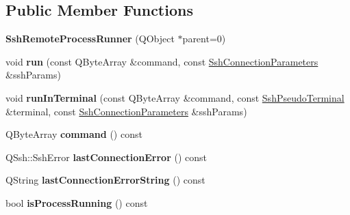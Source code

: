 \subsection*{Public Member Functions}
\begin{DoxyCompactItemize}
\item 
\mbox{\label{class_q_ssh_1_1_ssh_remote_process_runner_ab0f5cac4c6ac449102682a8c6d2ccff6}} 
{\bfseries Ssh\+Remote\+Process\+Runner} (Q\+Object $\ast$parent=0)
\item 
\mbox{\label{class_q_ssh_1_1_ssh_remote_process_runner_af01e487a7ab425c380976ed5f9e18e07}} 
void {\bfseries run} (const Q\+Byte\+Array \&command, const \mbox{\hyperlink{class_q_ssh_1_1_ssh_connection_parameters}{Ssh\+Connection\+Parameters}} \&ssh\+Params)
\item 
\mbox{\label{class_q_ssh_1_1_ssh_remote_process_runner_afe608d1bd15b61b8ef70d24dd8b9edbe}} 
void {\bfseries run\+In\+Terminal} (const Q\+Byte\+Array \&command, const \mbox{\hyperlink{class_q_ssh_1_1_ssh_pseudo_terminal}{Ssh\+Pseudo\+Terminal}} \&terminal, const \mbox{\hyperlink{class_q_ssh_1_1_ssh_connection_parameters}{Ssh\+Connection\+Parameters}} \&ssh\+Params)
\item 
\mbox{\label{class_q_ssh_1_1_ssh_remote_process_runner_afd37feaf8768515816cd91535a7963d1}} 
Q\+Byte\+Array {\bfseries command} () const
\item 
\mbox{\label{class_q_ssh_1_1_ssh_remote_process_runner_afcdfe6229766c913d1ae447be0a770a1}} 
Q\+Ssh\+::\+Ssh\+Error {\bfseries last\+Connection\+Error} () const
\item 
\mbox{\label{class_q_ssh_1_1_ssh_remote_process_runner_a7bea05575fef274b99e0e406fdc94659}} 
Q\+String {\bfseries last\+Connection\+Error\+String} () const
\item 
\mbox{\label{class_q_ssh_1_1_ssh_remote_process_runner_ae232f682abe871c1c4d439937ef43cb5}} 
bool {\bfseries is\+Process\+Running} () const
\item 

\end{DoxyCompactItemize}

